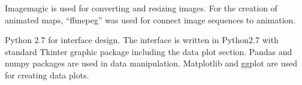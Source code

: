 Imagemagic is used for converting and resizing images. For the
creation of animated maps, ``ffmepeg'' was used for connect image
sequences to animation.

Python 2.7 for interface design. The interface is written
in Python2.7 with standard Tkinter graphic package including the data
plot section. Pandas and numpy packages are used in data
manipulation. Matplotlib and ggplot are used for creating data plots.

\begin{comment}
\section{Future Trends}
Harrower and Fabrikant mentioned that the chanllenge of using animated
maps is the overflow of information and the vulnerability to
distraction~\cite{Harrower2008}. One example mentioned by Harrower and
Fabrikant is the comparison of color on the map and that on the legend
becomes difficult for animated maps as a result of the changing of
images. They proposed the audio legend approach of strengthening
information convey with minimized
distraction~\cite{Harrower2008}. This might become one of the next
extensions of the current Dynamic Energy Map interface design.

They also suggested that the difference in time should have different
visual representations in data display~\cite{Harrower2008}. Peuquet
claimed that ``The development of temporal analytical capabilities in
GIS such as temporal queries requires basic topological structures in
both time and space''~\cite{Peuquet1994}. Thus the different spatial
representation seems to be a natural choice for adapting to different
temporal resolution and scale.



The non-interactive animation could be found
\href{http://www.armechxyj.com/energy-mapping.html#redblueAnime3d}{through
  this link}.
\end{comment}